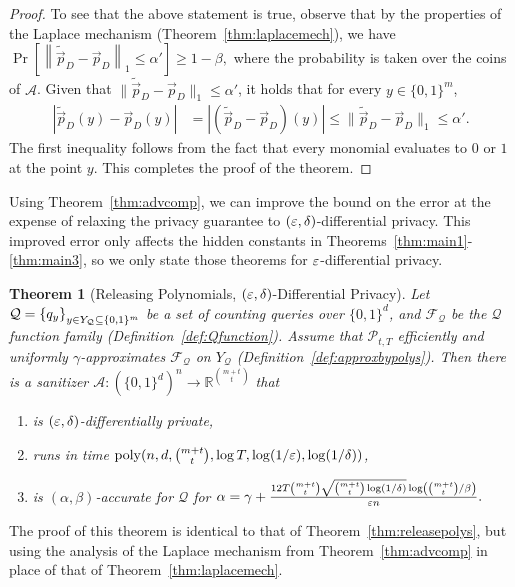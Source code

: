 \documentclass[11pt]{article}
\newcommand\R{\mathbb{R}}
\newcommand\cA{\mathcal{A}}
\newcommand\cF{\mathcal{F}}
\newcommand\cP{\mathcal{P}}
\newcommand\cQ{\mathcal{Q}}
\newcommand\san{\mathcal{A}}
\newcommand\poly{\mathrm{poly}}
\newcommand\bits{\{0,1\}}
\newcommand\from{\colon}
\newcommand{\prob}[1]{\Pr\left[#1\right]}
\newtheorem{theorem}{Theorem}[section]
\theoremstyle{definition}
\begin{document}
\begin{proof}
To see that the above statement is true, observe that by the properties of the Laplace mechanism (Theorem~\ref{thm:laplacemech}), we have
$
\prob{ \left\| \tilde{\vec{p}}_{D} - \vec{p}_{D} \right\|_1 \leq \alpha'} \geq 1-\beta,
$
where the probability is taken over the coins of $\cA$. Given that $\|\tilde{\vec{p}}_{D} - \vec{p}_{D} \|_1 \leq \alpha'$, it holds that for every $y \in \bits^m$,
\begin{align*}
\left| \tilde{\vec{p}}_{D}(y) - \vec{p}_D(y) \right| 
&={} \left| (\tilde{\vec{p}}_{D} - \vec{p}_D)(y) \right| \leq{} \| \tilde{\vec{p}}_{D} - \vec{p}_D \|_1
\leq{} \alpha'.
\end{align*}
The first inequality follows from the fact that every monomial evaluates to $0$ or $1$ at the point $y$.  This completes the proof of the theorem.

\end{proof}

Using Theorem~\ref{thm:advcomp}, we can improve the bound on the error at the expense of relaxing the privacy guarantee to $(\varepsilon, \delta)$-differential privacy.  This improved error only affects the hidden constants in Theorems~\ref{thm:main1}-\ref{thm:main3}, so we only state those theorems for $\varepsilon$-differential privacy.
\begin{theorem}[Releasing Polynomials, $(\varepsilon, \delta)$-Differential Privacy] \label{thm:advreleasepolys}
Let $\cQ = \set{q_y}_{y \in Y_{\cQ} \subseteq \bits^m}$ be a set of counting queries over $\bits^d$, and $\cF_{\cQ}$ be the $\cQ$ function family (Definition~\ref{def:Qfunction}).  Assume that $\cP_{t,T}$ efficiently and uniformly $\gamma$-approximates $\cF_{\cQ}$ on $Y_{\cQ}$ (Definition~\ref{def:approxbypolys}).  Then there is a sanitizer $\san\from (\bits^d)^n \to \R^{\binom{m+t}{t}}$ that
\begin{enumerate}
\item is $(\varepsilon,\delta)$-differentially private,
\item runs in time $\poly(n, d, \binom{m+t}{t}, \log T, \log(1/\eps), \log (1/\delta))$,
\item is $(\alpha, \beta)$-accurate for $\cQ$ for
$
\alpha = \gamma + \frac{12 T \binom{m+t}{t} \sqrt{\binom{m+t}{t} \log(1/\delta)} \log\left(\binom{m+t}{t} / \beta\right)}{\varepsilon n}.
$
\end{enumerate}
\end{theorem}
The proof of this theorem is identical to that of Theorem~\ref{thm:releasepolys}, but using the analysis of the Laplace mechanism from Theorem~\ref{thm:advcomp} in place of that of Theorem~\ref{thm:laplacemech}.
\end{document}
